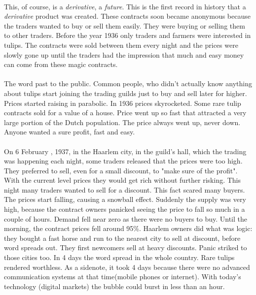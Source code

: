 \documentclass{article}
\begin{document}
\paragraph{ }
This, of course, is a \emph{derivative}, a \emph{future}. This is the first record in history that a \emph{derivative} product was created. These contracts soon became anonymous because the traders wanted to buy or sell them easily. They were buying or selling them to other traders. Before the year 1936 only traders and farmers were interested in tulips. The contracts were sold between them every night and the prices were slowly gone up until the traders had the impression that much and easy money can come from these magic contracts.
\paragraph{ }
The word past to the public. Common people, who didn't actually know anything about tulips start joining the trading guilds just to buy and sell later for higher. Prices started raising in parabolic. In 1936 prices skyrocketed. Some rare tulip contracts sold for a value of a house. Price went up so fast that attracted a very large portion of the Dutch population. The price always went up, never down. Anyone wanted a sure profit, fast and easy.
\paragraph{ }
On 6 February , 1937, in the Haarlem city, in the guild's hall, which the trading was happening each night, some traders released that the prices were too high. They preferred to sell, even for a small discount, to "make sure of the profit". With the current level prices they would get rich without further risking. This night many traders wanted to sell for a discount. This fact scared many buyers. The prices start falling, causing a snowball effect. Suddenly the supply was very high, because the contract owners panicked seeing the price to fall so much in a couple of hours. Demand fell near zero as there were no buyers to buy. Until the morning, the contract prices fell around 95\%. Haarlem owners did what was logic: they bought a fast horse and run to the nearest city to sell at discount, before word spreads out. They first newcomers sell at heavy discounts.  Panic striked to those cities too. In 4 days the word spread in the whole country. Rare tulips rendered worthless. As a sidenote, it took 4 days because there were no advanced communication systems at that time(mobile phones or internet). With today's technology (digital markets) the bubble could burst in less than an hour.
\end{document}
